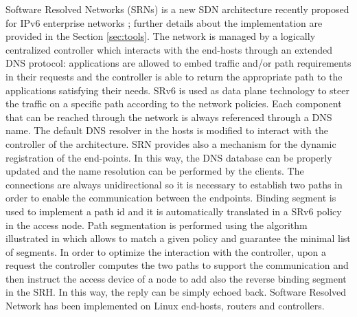 Software Resolved Networks (SRNs) is a new SDN architecture recently proposed for IPv6 enterprise networks \cite{lebrun2018software}\cite{duchene2018exploring}; further details about the implementation are provided in the Section \ref{sec:tools}. The network is managed by a logically centralized controller which interacts with the end-hosts through an extended DNS protocol: applications are allowed to embed traffic and/or path requirements in their requests and the controller is able to return the appropriate path to the applications satisfying their needs. SRv6 is used as data plane technology to steer the traffic on a specific path according to the network policies. Each component that can be reached through the network is always referenced through a DNS name. The default DNS resolver in the hosts is modified to interact with the controller of the architecture. SRN provides also a mechanism for the dynamic registration of the end-points. In this way, the DNS database can be properly updated and the name resolution can be performed by the clients. The connections are always unidirectional so it is necessary to establish two paths in order to enable the communication between the endpoints. Binding segment is used to implement a path id and it is automatically translated in a SRv6 policy in the access node. Path segmentation is performed using the algorithm illustrated in \cite{scmon} which allows to match a given policy and guarantee the minimal list of segments. In order to optimize the interaction with the controller, upon a request the controller computes the two paths to support the communication and then instruct the access device of a node to add also the reverse binding segment in the SRH. In this way, the reply can be simply echoed back. Software Resolved Network has been implemented on Linux end-hosts, routers and controllers. %

